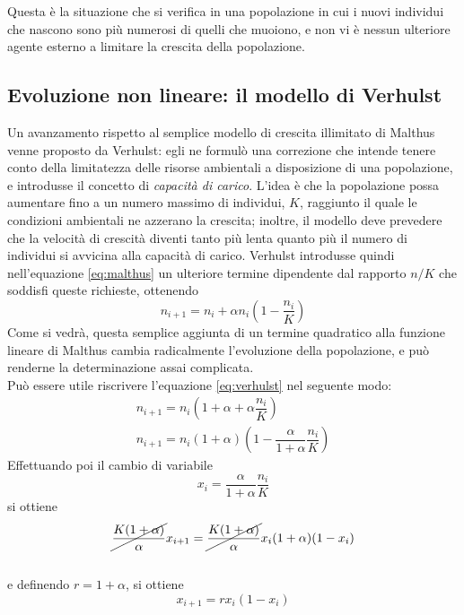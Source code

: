 Questa è la situazione che si verifica in una popolazione in cui i nuovi individui che nascono sono più numerosi di quelli che muoiono, e non vi è nessun ulteriore agente esterno a limitare la crescita della popolazione.

\subsection{Evoluzione non lineare: il modello di Verhulst}
Un avanzamento rispetto al semplice modello di crescita illimitato di Malthus venne proposto da Verhulst: egli ne formulò una correzione che intende tenere conto della limitatezza delle risorse ambientali a disposizione di una popolazione, e introdusse il concetto di \textit{capacità di carico}. L'idea è che la popolazione possa aumentare fino a un numero massimo di individui, $K$, raggiunto il quale le condizioni ambientali ne azzerano la crescita; inoltre, il modello deve prevedere che la velocità di crescità diventi tanto più lenta quanto più il numero di individui si avvicina alla capacità di carico. Verhulst introdusse quindi nell'equazione \ref{eq:malthus} un ulteriore termine dipendente dal rapporto $n/K$ che soddisfi queste richieste, ottenendo
\begin{equation}
    n_{i+1} = n_i + \alpha n_i(1-\frac{n_i}{K})
    \label{eq:verhulst}
\end{equation}
Come si vedrà, questa semplice aggiunta di un termine quadratico alla funzione lineare di Malthus cambia radicalmente l'evoluzione della popolazione, e può renderne la determinazione assai complicata.
\\
Può essere utile riscrivere l'equazione \ref{eq:verhulst} nel seguente modo:
\begin{equation*}
    \begin{gathered}
        n_{i+1} = n_i (1+\alpha+\alpha \dfrac{n_i}{K}) \\
        n_{i+1} =  n_i (1+\alpha) (1- \dfrac{\alpha}{1+\alpha} \dfrac{n_i}{K})
    \end{gathered}
\end{equation*}
Effettuando poi il cambio di variabile
$$x_i = \dfrac{\alpha}{1+\alpha} \dfrac{n_i}{K}$$
 si ottiene 
$$  \cancel{\frac{K (1+\alpha)}{\alpha}} x_{i+1} = \cancel{\frac{K (1+\alpha)}{\alpha}} x_i (1+\alpha) (1- x_i) $$\\
e definendo $r = 1+ \alpha$, si ottiene
\begin{equation}
    x_{i+1} = r x_i (1-x_i)
    \label{eq:logistica}
\end{equation}

